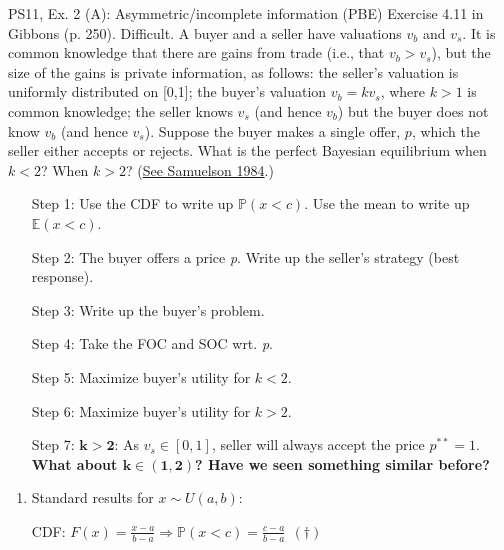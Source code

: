 \begin{frame}{PS11, Ex. 2 (A): Asymmetric/incomplete information (PBE)}
    Exercise 4.11 in Gibbons (p. 250). Difficult. A buyer and a seller have valuations $v_b$ and $v_s$. It is common knowledge that there are gains from trade (i.e., that $v_b > v_s$), but the size of the gains is private information, as follows: the seller’s valuation is uniformly distributed on [0,1]; the buyer’s valuation $v_b = kv_s$, where $k > 1$ is common knowledge; the seller knows $v_s$ (and hence $v_b$) but the buyer does not know $v_b$ (and hence $v_s$). Suppose the buyer makes a single offer, $p$, which the seller either accepts or rejects. What is the perfect Bayesian equilibrium when $k < 2$? When $k > 2$? (\href{https://www.jstor.org/stable/1911195}{See Samuelson 1984}.) \vspace{-8pt}
    \begin{multicols}{2}
      \begin{itemize}
        \item[Step 1:] Use the CDF to write up $\mathbb{P}(x<c)$. Use the mean to write up $\mathbb{E}(x<c)$.
        \item[Step 2:] \vspace{-2pt} The buyer offers a price \textit{p}. Write up the seller's strategy (best response).
        \item[Step 3:] \vspace{-2pt} Write up the buyer's problem.
        \item[Step 4:] \vspace{-2pt} Take the FOC and SOC wrt. \textit{p}.
        \item[Step 5:] \vspace{-2pt} Maximize buyer's utility for $k<2$.
        \item[Step 6:] \vspace{-2pt} Maximize buyer's utility for $k>2$.
        \item[Step 7:] \vspace{-2pt} $\bm{k>2}$: As $v_s\in[0,1]$, seller will always accept the price $p^{**}=1$.\\
        \textbf{What about $\bm{k\in(1,2)}$? Have we seen something similar before?}
      \end{itemize}
      \vfill\null\columnbreak
      \begin{enumerate}
        \item \vspace{-2pt} Standard results for $x\sim U(a, b):$
        \item[CDF:] \vspace{-2pt} $F(x)=\frac{x-a}{b-a}\Rightarrow\mathbb{P}(x<c)=\frac{c-a}{b-a}\ \ (\dagger)$

\end{enumerate}
\end{multicols}
\end{frame}
